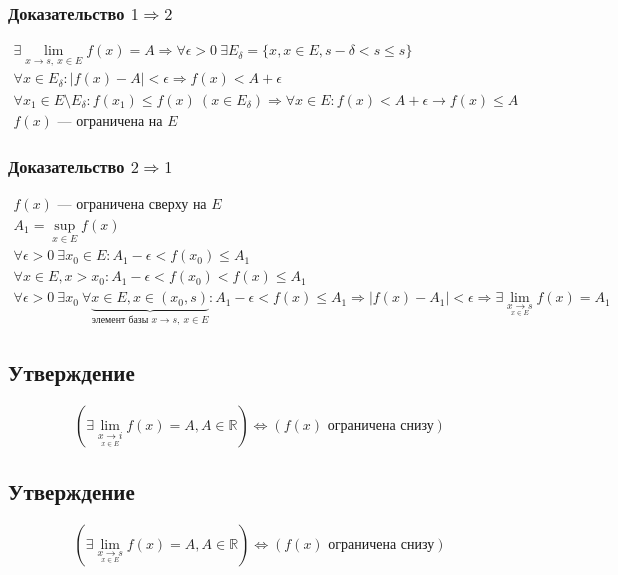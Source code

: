 \documentclass{article}
\begin{document}
\subsubsection{Доказательство $1 \Rightarrow 2$}
\begin{gather*}
    \exists \lim_{x \to s, ~ x \in E} f(x) = A \Rightarrow
    \forall \epsilon > 0 ~ \exists E_{\delta} = \{x, x \in E, s - \delta < s \le s\} \\
    \forall x \in E_{\delta}: |f(x) - A| < \epsilon \Rightarrow f(x) < A + \epsilon \\
    \forall x_1 \in E \setminus E_{\delta}: f(x_1) \le f(x) ~ (x \in E_{\delta}) \Rightarrow
    \forall x \in E: f(x) < A + \epsilon \rightarrow f(x) \le A \\
    f(x) \text{ --- ограничена на } E
\end{gather*}

\subsubsection{Доказательство $2 \Rightarrow 1$}
\begin{gather*}
    f(x) \text{ --- ограничена сверху на } E \\
    A_1 = \sup_{x \in E} f(x) \\
    \forall \epsilon > 0 ~ \exists x_0 \in E: A_1 - \epsilon < f(x_0) \le A_1 \\
    \forall x \in E, x > x_0: A_1 - \epsilon < f(x_0) < f(x) \le A_1 \\
    \forall \epsilon > 0 ~ \exists x_0 ~ \forall \underbrace{x \in E, x \in (x_0, s)}_{\text{элемент базы } x \rightarrow s, ~ x \in E}:
    A_1 - \epsilon < f(x) \le A_1 \Rightarrow
    |f(x) - A_1| < \epsilon \Rightarrow \exists \lim_{\underset{x \in E}{x \to s}} f(x) = A_1
\end{gather*}


\subsection{Утверждение}
\[
    \left( \exists \lim_{\underset{x \in E}{x \to i}} f(x) = A, A \in \mathbb{R} \right) \Leftrightarrow
    \left( f(x) \text{ ограничена снизу}\right)
\]


\subsection{Утверждение}
\[
    \left( \exists \lim_{\underset{x \in E}{x \to s}} f(x) = A, A \in \mathbb{R} \right) \Leftrightarrow
    \left( f(x) \text{ ограничена снизу}\right)
\]
\end{document}
